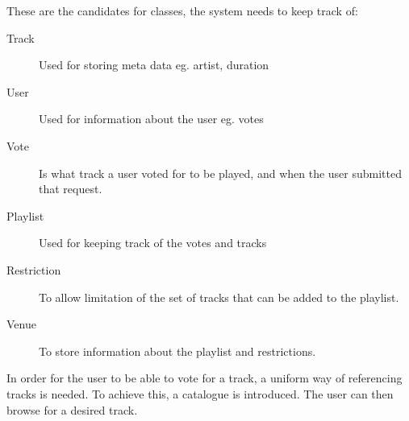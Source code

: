 These are the candidates for classes, the system needs to keep track of:
\begin{description}
    \item[Track]

    Used for storing meta data eg. artist, duration
    \item[User]

    Used for information about the user eg. votes
    \item[Vote]

    Is what track a user voted for to be played, and when the user submitted that request.
    \item[Playlist]

    Used for keeping track of the votes and tracks
    \item[Restriction]

    To allow limitation of the set of tracks that can be added to the playlist.
    \item[Venue]

    To store information about the playlist and restrictions.
\end{description}

In order for the user to be able to vote for a track, a uniform way of referencing tracks is needed. To achieve this, a catalogue is introduced. The user can then browse for a desired track.

